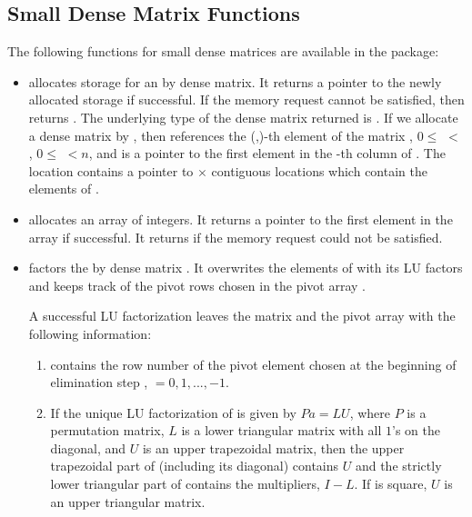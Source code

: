 \subsection{Small Dense Matrix Functions}
The following functions for small dense matrices are available in the
{\dense} package:
%
\begin{itemize}

\item {}
  \par {} allocates storage for an  by  dense matrix. 
  It returns a pointer to the newly allocated storage if            
  successful. If the memory request cannot be satisfied, then    
   returns . The underlying type of the dense matrix 
  returned is . If we allocate a dense matrix  by 
  , then  references the (,)-th element   
  of the matrix , $0 \le$  $<$ , $0 \le$  $<n$, and  
  is a pointer to the first element in the -th column of . 
  The location  contains a pointer to  $\times$  contiguous 
  locations which contain the elements of .

\item {}
  \par {} allocates an array of  integers. 
  It returns a pointer to the first element in the array if successful. 
  It returns  if the memory request could not be satisfied.

\item {}
  \par {} factors the  by  dense matrix . 
  It overwrites the elements of  with its LU factors and keeps track of the
  pivot rows chosen in the pivot array .

  A successful LU factorization leaves the matrix  and the      
  pivot array  with the following information:                  
  \begin{enumerate}
  \item 
     contains the row number of the pivot element chosen   
    at the beginning of elimination step ,  $ = 0, 1, ..., $$-1$.  
                                                                 
  \item 
    If the unique LU factorization of  is given by $Pa = LU$,   
    where $P$ is a permutation matrix, $L$ is a lower triangular   
    matrix with all $1$'s on the diagonal, and $U$ is an upper     
    trapezoidal matrix, then the upper trapezoidal part of      
    (including its diagonal) contains $U$ and the strictly lower 
    triangular part of  contains the multipliers, $I-L$. 
    If  is square, $U$ is an upper triangular matrix.
                      

\end{enumerate}
\end{itemize}
